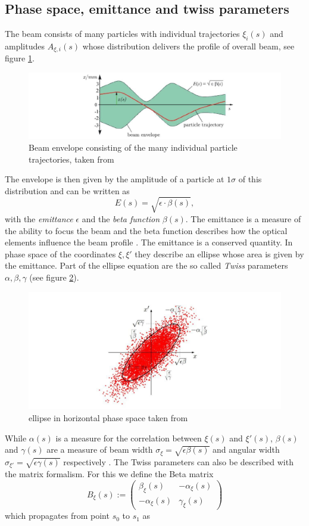 \documentclass[11pt,a4paper,notitlepage]{scrartcl}
\begin{document}
\subsection{Phase space, emittance and twiss parameters}
The beam consists of many particles with individual trajectories $\xi_i(s)$ and amplitudes $A_{\xi,i}(s)$ whose distribution delivers the profile of overall beam, see figure \ref{fig:beam}.
\begin{figure}[htbp]
	\centering
	\includegraphics[width=.7\linewidth]{beam}
	\caption{Beam envelope consisting of the many individual particle trajectories, taken from \cite{script}}
	\label{fig:beam}
\end{figure} 
The envelope is then given by the amplitude of a particle at $1\sigma$ of this distribution \cite{script} and can be written as 
\begin{equation}
	E(s)=\sqrt{\epsilon\cdot\beta(s)},
\end{equation}
with the \emph{emittance} $\epsilon$ and the \emph{beta function} $\beta(s)$. The emittance is a measure of the ability to focus the beam and the beta function describes how the optical elements influence the beam profile \cite{script}. The emittance is a conserved quantity. In phase space of the coordinates $\xi,\xi'$ they describe an ellipse whose area is given by the emittance. Part of the ellipse equation are the so called \emph{Twiss} parameters $\alpha,\beta,\gamma$ (see figure \ref{fig:ellipse}).

\begin{figure}[htbp]
	\centering
	\includegraphics[width=.7\linewidth]{ellipse}
	\caption{ellipse in horizontal phase space taken from \cite{script}}
	\label{fig:ellipse}
\end{figure}

 While $\alpha(s)$ is a measure for the correlation between $\xi(s)$ and $\xi'(s)$, $\beta(s)$ and $\gamma(s)$ are a measure of beam width $\sigma_\xi=\sqrt{\epsilon\beta(s)}$ and angular width $\sigma_{\xi'}=\sqrt{\epsilon\gamma(s)}$ respectively \cite{script}. The Twiss parameters can also be described with the matrix formalism. For this we define the Beta matrix \begin{equation}
	B_\xi(s):=\begin{pmatrix}
		\beta_\xi(s) & -\alpha_\xi(s)\\
		-\alpha_\xi(s)& \gamma_\xi(s)
	\end{pmatrix}
\end{equation}
which propagates from point $s_0$ to $s_1$ as \cite{wille}
\end{document}
